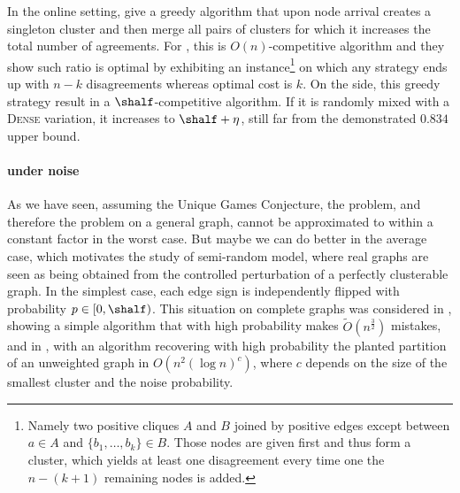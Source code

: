 In the online setting, \textcite{greedyOnline10} give a greedy algorithm that upon node arrival creates a
singleton cluster and then merge all pairs of clusters for which it increases the total number of
agreements. For \mind{}, this is $O(n)$-competitive algorithm and they show such ratio is optimal by
exhibiting an instance\footnote{Namely two positive cliques $A$ and $B$ joined by positive edges except
between $a\in A$ and $\{b_1,\ldots, b_k\}\in B$. Those nodes are given first and thus form a cluster,
which yields at least one disagreement every time one the $n-(k+1)$ remaining nodes is added.} on
which any strategy ends up with $n - k$ disagreements whereas optimal cost is $k$. On the \maxa{}
side, this greedy strategy result in a $\shalf$-competitive algorithm. If it is randomly mixed with a
\textsc{Dense} variation, it increases to $\shalf+\eta$, still far from the demonstrated $0.834$ upper
bound.

\paragraph{\pcc{} under noise}

As we have seen, assuming the Unique Games Conjecture, the \mmc{} problem, and therefore
the \pcc{} problem on a general graph, cannot be approximated to within a constant factor in the worst
case.  But maybe we can do better in the average case, which motivates the study of semi-random
model, where real graphs are seen as being obtained from the controlled perturbation of a perfectly
clusterable graph. In the simplest case, each edge sign is independently flipped with probability
$p \in [0, \shalf)$. This situation on complete graphs was considered in \autocite[Section
6]{Bansal2002}, showing a simple algorithm that with high probability makes
$\tilde{O}(n^\frac{3}{2})$ mistakes, and in \autocite[Theorem 2.6]{Ben-Dor99}, with an algorithm
recovering with high probability the planted partition of an unweighted graph in $O(n^2(\log n)^c)$,
where $c$ depends on the size of the smallest cluster and the noise probability.

